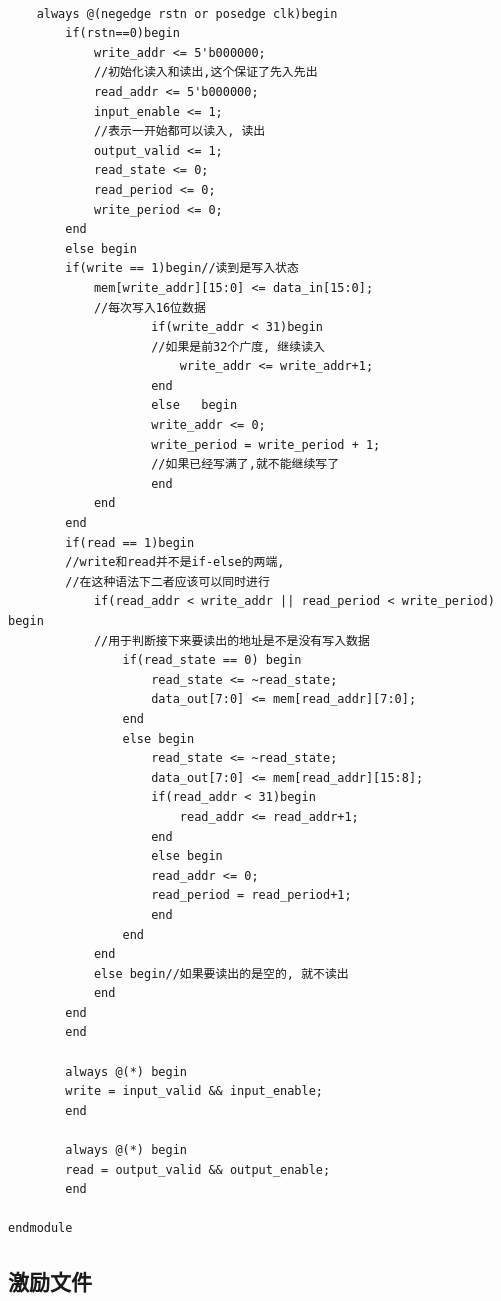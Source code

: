 \documentclass[fontset=windows,12pt]{article}
\begin{document}
{\begin{lstlisting}
    
    always @(negedge rstn or posedge clk)begin
        if(rstn==0)begin
            write_addr <= 5'b000000;
            //初始化读入和读出,这个保证了先入先出
            read_addr <= 5'b000000;
            input_enable <= 1;
            //表示一开始都可以读入, 读出
            output_valid <= 1;
            read_state <= 0;
            read_period <= 0;
            write_period <= 0;
        end
        else begin
        if(write == 1)begin//读到是写入状态
            mem[write_addr][15:0] <= data_in[15:0];
            //每次写入16位数据
                    if(write_addr < 31)begin
                    //如果是前32个广度, 继续读入
                        write_addr <= write_addr+1;
                    end
                    else   begin
                    write_addr <= 0;
                    write_period = write_period + 1;    
                    //如果已经写满了,就不能继续写了    
                    end
            end
        end
        if(read == 1)begin
        //write和read并不是if-else的两端, 
        //在这种语法下二者应该可以同时进行
            if(read_addr < write_addr || read_period < write_period) begin
            //用于判断接下来要读出的地址是不是没有写入数据
                if(read_state == 0) begin
                    read_state <= ~read_state;
                    data_out[7:0] <= mem[read_addr][7:0];
                end
                else begin
                    read_state <= ~read_state;
                    data_out[7:0] <= mem[read_addr][15:8];
                    if(read_addr < 31)begin
                        read_addr <= read_addr+1;
                    end
                    else begin
                    read_addr <= 0;
                    read_period = read_period+1;
                    end
                end
            end
            else begin//如果要读出的是空的, 就不读出
            end
        end
        end
        
        always @(*) begin
        write = input_valid && input_enable;
        end
        
        always @(*) begin
        read = output_valid && output_enable;
        end
        
endmodule
    \end{lstlisting}}


       
\subsection{激励文件}
\end{document}
